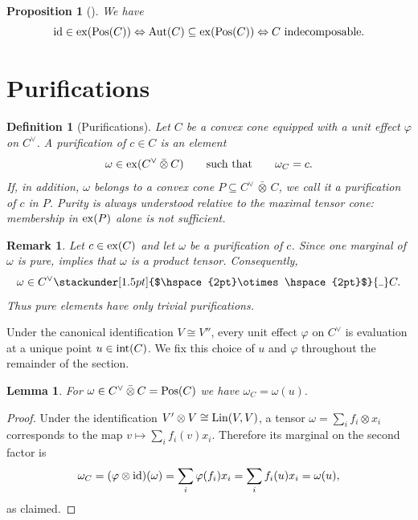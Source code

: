 \documentclass[11pt]{article}
\newcommand\barbelow[1]{\stackunder[1.5pt]{$\hspace{2pt}#1\hspace{2pt}$}{\rule{1ex}{0.075ex}}}
\newcommand{\barabove}[1]{\hspace{2pt}\bar{#1}\hspace{2pt}}
\theoremstyle{result}
\newtheorem{lemma}[lemma]{Lemma}
\newtheorem{proposition}[proposition]{Proposition}
\theoremstyle{discussion}
\newtheorem{remark}[remark]{Remark}
\newtheorem{definition}[definition]{Definition}
\newcommand{\omin}{\barbelow{\otimes}}
\newcommand{\omax}{\barabove{\otimes}}
\begin{document}
\begin{proposition}[{\citealp[Theorem 2.B.2]{Barker1981}}]
\label{prop:automorphisms-extreme}
    We have $${\rm id}\in{\rm ex}({\rm Pos}(C))\Leftrightarrow {\rm Aut}(C)\subseteq{\rm ex}({\rm Pos}(C))\Leftrightarrow C \mbox{ indecomposable}.$$
\end{proposition}

\section{Purifications}

\begin{definition}[Purifications]
    Let $C$ be a convex cone equipped with a unit effect $\varphi$ on
    $C^\vee$. A \emph{purification} of $c\in C$ is an element
    \[
        \omega\in{\rm ex}(C^\vee\omax C)
        \qquad\text{such that}\qquad
        \omega_C=c.
    \]
    If, in addition, $\omega$ belongs to a convex cone
    $P\subseteq C^\vee\omax C$, we call it a \emph{purification of $c$ in
    $P$}. Purity is always understood relative to the maximal tensor cone:
    membership in ${\rm ex}(P)$ alone is not sufficient.
\end{definition}

\begin{remark}
    Let $c\in{\rm ex}(C)$ and let $\omega$ be a purification of $c$.
    Since one marginal of $\omega$ is pure,
     implies that $\omega$ is a product
    tensor. Consequently,
    \[
        \omega\in C^\vee\omin C.
    \]
    Thus pure elements have only trivial purifications.
\end{remark}

Under the canonical identification $V\cong V''$, every unit effect
$\varphi$ on $C^\vee$ is evaluation at a unique point
$u\in{\rm int}(C)$.
We fix this choice of $u$ and $\varphi$ throughout the remainder of the
section.

\begin{lemma}
\label{lem:marginal-evaluation}
    For $\omega\in C^\vee\omax C={\rm Pos}(C)$ we have $\omega_C=\omega(u).$     
\end{lemma}

\begin{proof}
    Under the identification $V'\otimes V\cong{\rm Lin}(V,V)$, a tensor
    $\omega=\sum_i f_i\otimes x_i$ corresponds to the map
    $v\mapsto\sum_i f_i(v)x_i$. Therefore its marginal on the second factor is
    \[
        \omega_C
        =(\varphi\otimes{\rm id})(\omega)
        =\sum_i \varphi(f_i)x_i
        =\sum_i f_i(u)x_i
        =\omega(u),
    \]
    as claimed.
\end{proof}
\end{document}

